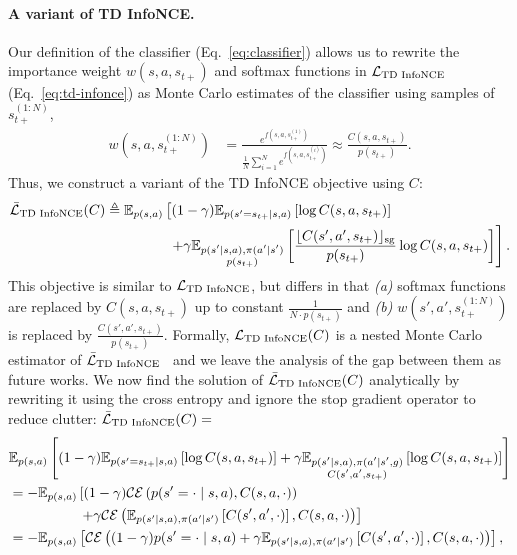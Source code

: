 \documentclass{article} %
\newcommand{\CE}{\mathcal{CE}}
\begin{document}
\paragraph{A variant of TD InfoNCE.} Our definition of the classifier (Eq.~\ref{eq:classifier}) allows us to rewrite the importance weight $w(s, a, s_{t+})$ and softmax functions in ${\mathcal{L}}_{\text{TD InfoNCE}}$ (Eq.~\ref{eq:td-infonce}) as Monte Carlo estimates of the classifier using samples of $s_{t+}^{(1:N)}$,
\begin{align*}
    w(s, a, s_{t+}^{(1:N)}) &= \frac{e^{f(s, a, s_{t+}^{(1)})}}{ \frac{1}{N} \sum_{i = 1}^N e^{f(s, a, s_{t+}^{(i)})}} \approx \frac{C(s, a, s_{t+})}{p(s_{t+})}.
\end{align*}
Thus, we construct a variant of the TD InfoNCE objective using $C$:
\begin{align*}
    \bar{{\mathcal{L}}}_{\text{TD InfoNCE}}(C) &\triangleq \mathbb{E}_{p(s, a)} \left[ (1 - \gamma) \mathbb{E}_{p(s' = s_{t+} \mid s, a)} \left[\log C(s, a, s_{t+}) \right] \right. \nonumber \\ 
    &\hspace{4.5em} \left. + \gamma \mathbb{E}_{\substack{p(s' \mid s, a), \pi(a' \mid s') \\ p(s_{t+}) } } \left[ \frac{\lfloor C(s', a', s_{t+}) \rfloor_{\text{sg}}}{p(s_{t+})} \log C(s, a, s_{t+}) \right] \right].
\end{align*}
This objective is similar to ${\mathcal{L}}_{\text{TD InfoNCE}}$, but differs in that \emph{(a)} softmax functions are replaced by $C(s, a, s_{t+})$ up to constant $\frac{1}{N \cdot p(s_{t+})}$ and \emph{(b)} $w(s', a', s_{t+}^{(1:N)})$ is replaced by $\frac{C(s', a', s_{t+})}{p(s_{t+})}$. Formally, ${\mathcal{L}}_{\text{TD InfoNCE}}(C)$ is a nested Monte Carlo estimator of $\bar{{\mathcal{L}}}_{\text{TD InfoNCE}}$~\citep{rainforth2018nesting,giles2015multilevel} and we leave the analysis of the gap between them as future works. We now find the solution of $\bar{{\mathcal{L}}}_{\text{TD InfoNCE}}(C)$ analytically by rewriting it using the cross entropy and ignore the stop gradient operator to reduce clutter: $\bar{{\mathcal{L}}}_{\text{TD InfoNCE}}(C) =$
\begin{align}
    &\E_{p(s, a)} \left[ (1 - \gamma) \E_{p(s' = s_{t+} \mid s, a)} \left[\log C(s, a, s_{t+}) \right] + \gamma \E_{\substack{p(s' \mid s, a), \pi(a' \mid s', g) \\ C(s', a', s_{t+}) } } \left[ \log C(s, a, s_{t+}) \right] \right] \nonumber \\
    &= -\E_{p(s, a)} \left[ (1 - \gamma) \CE \left(p(s' = \cdot \mid s, a), C(s, a, \cdot) \right) \right. \nonumber \\
    & \hspace{5em} \left. + \gamma \CE \left(\E_{p(s' \mid s, a), \pi(a' \mid s')} \left[ C(s', a', \cdot) \right], C(s, a, \cdot) \right) \right] \nonumber \\
    &= -\E_{p(s, a)} \left[ \CE \left((1 - \gamma) p(s' = \cdot \mid s, a) + \gamma \E_{p(s' \mid s, a), \pi(a' \mid s')} \left[ C(s', a', \cdot) \right], C(s, a, \cdot) \right) \right],
    \label{eq:td-infonce-expectation-ce}
\end{align}
\end{document}

